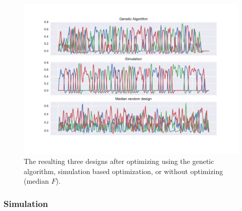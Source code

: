 \documentclass[article]{jss}
\begin{document}
\begin{figure}[t!]
\centering
\includegraphics[scale=0.35, trim = 0 20 0 20, clip]{designs.pdf}
\caption{The resulting three designs after optimizing using the genetic algorithm, simulation based optimization, or without optimizing (median $F$).\label{designs}}
\end{figure}

\subsubsection{Simulation}
\end{document}
